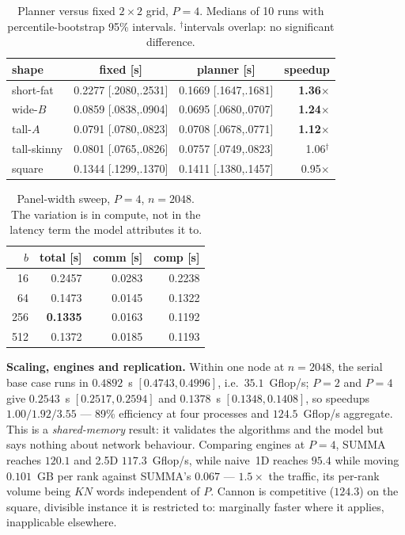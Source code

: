 \documentclass[conference,10pt]{IEEEtran}
\begin{document}
\begin{table}[t]
\caption{Planner versus fixed $2\times2$ grid, $P{=}4$. Medians of 10 runs with
percentile-bootstrap 95\% intervals. $^{\dagger}$intervals overlap: no
significant difference.}
\label{tab:shapes}
\centering\small
\begin{tabular}{lccr}
\toprule
shape & fixed [s] & planner [s] & speedup \\
\midrule
short-fat & 0.2277 \tiny[.2080,.2531] & 0.1669 \tiny[.1647,.1681] & \textbf{1.36}$\times$ \\
wide-$B$  & 0.0859 \tiny[.0838,.0904] & 0.0695 \tiny[.0680,.0707] & \textbf{1.24}$\times$ \\
tall-$A$  & 0.0791 \tiny[.0780,.0823] & 0.0708 \tiny[.0678,.0771] & \textbf{1.12}$\times$ \\
tall-skinny & 0.0801 \tiny[.0765,.0826] & 0.0757 \tiny[.0749,.0823] & 1.06$^{\dagger}$ \\
square    & 0.1344 \tiny[.1299,.1370] & 0.1411 \tiny[.1380,.1457] & 0.95$\times$ \\
\bottomrule
\end{tabular}
\end{table}

\begin{table}[t]
\caption{Panel-width sweep, $P=4$, $n=2048$. The variation is in compute,
not in the latency term the model attributes it to.}
\label{tab:bsweep}
\centering
\small
\begin{tabular}{rrrr}
\toprule
$b$ & total [s] & comm [s] & comp [s] \\
\midrule
16  & 0.2457 & 0.0283 & 0.2238 \\
64  & 0.1473 & 0.0145 & 0.1322 \\
256 & \textbf{0.1335} & 0.0163 & 0.1192 \\
512 & 0.1372 & 0.0185 & 0.1193 \\
\bottomrule
\end{tabular}
\end{table}

\textbf{Scaling, engines and replication.} Within one node at $n{=}2048$, the
serial base case runs in $0.4892$~s $[0.4743,0.4996]$, i.e.\ $35.1$~Gflop/s;
$P{=}2$ and $P{=}4$ give $0.2543$~s $[0.2517,0.2594]$ and $0.1378$~s
$[0.1348,0.1408]$, so speedups $1.00/1.92/3.55$ --- 89\% efficiency at four
processes and $124.5$~Gflop/s aggregate. This is a \emph{shared-memory} result: it
validates the algorithms and the model but says nothing about network
behaviour. Comparing engines at $P{=}4$, SUMMA reaches $120.1$ and 2.5D
$117.3$~Gflop/s, while naive~1D reaches $95.4$ while moving $0.101$~GB per rank
against SUMMA's $0.067$ --- $1.5\times$ the traffic, its per-rank volume being
$KN$ words independent of $P$. Cannon is competitive ($124.3$) on the square,
divisible instance it is restricted to: marginally faster where it applies,
inapplicable elsewhere.
\end{document}
